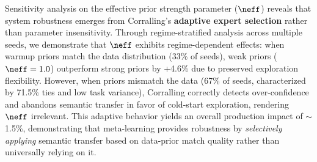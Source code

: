 
Sensitivity analysis on the effective prior strength parameter ($\neff$) reveals that system robustness emerges from Corralling's \textbf{adaptive expert selection} rather than parameter insensitivity. Through regime-stratified analysis across multiple seeds, we demonstrate that $\neff$ exhibits regime-dependent effects: when warmup priors match the data distribution (33\% of seeds), weak priors ($\neff=1.0$) outperform strong priors by +4.6\% due to preserved exploration flexibility. However, when priors mismatch the data (67\% of seeds, characterized by 71.5\% ties and low task variance), Corralling correctly detects over-confidence and abandons semantic transfer in favor of cold-start exploration, rendering $\neff$ irrelevant. This adaptive behavior yields an overall production impact of $\sim$1.5\%, demonstrating that meta-learning provides robustness by \textit{selectively applying} semantic transfer based on data-prior match quality rather than universally relying on it.

